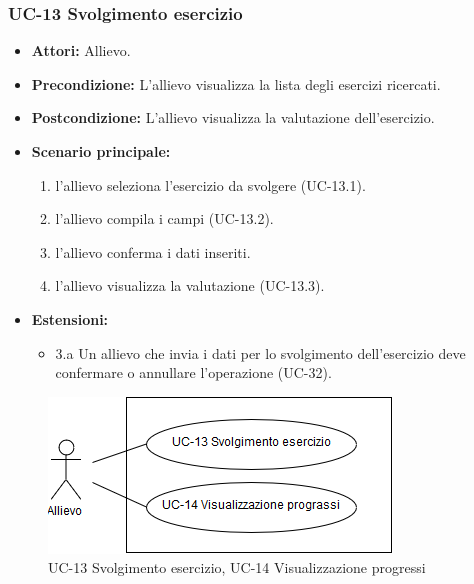 	\subsubsection{UC-13 Svolgimento esercizio}
	\begin{itemize}
	\item \textbf{Attori:} Allievo.
			\item \textbf{Precondizione:}  L'allievo visualizza la lista degli esercizi ricercati.
			\item \textbf{Postcondizione:} L'allievo visualizza la valutazione dell'esercizio.
			\item \textbf{Scenario principale:}
			\begin{enumerate}
				\item l'allievo seleziona l'esercizio da svolgere (UC-13.1).
				\item l'allievo compila i campi (UC-13.2).
				\item l'allievo conferma i dati inseriti.
				\item l'allievo visualizza la valutazione (UC-13.3).
			\end{enumerate}
		\item \textbf{Estensioni:}
		\begin{itemize}
			\item 3.a Un allievo che invia i dati per lo svolgimento dell'esercizio deve confermare o annullare l'operazione (UC-32).
		\end{itemize}
	\end{itemize}
	\begin{figure}[h]
		\centering
		\includegraphics[scale=0.7]{images/UC-13.png}
		\caption{UC-13 Svolgimento esercizio, UC-14 Visualizzazione progressi}
	\end{figure}	
			
